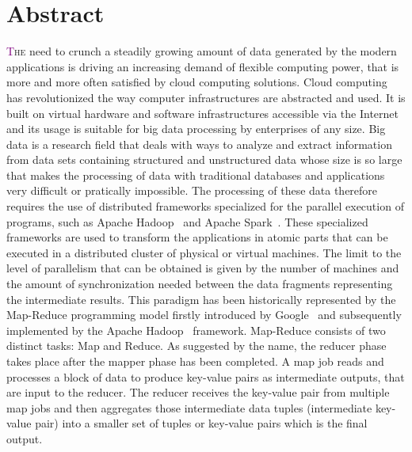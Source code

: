 
\begingroup
\let\clearpage\relax
\let\cleardoublepage\relax
\let\cleardoublepage\relax

\chapter*{Abstract}
\lettrine[lines=4]{\textcolor{purple}{T}}{he} need to crunch a steadily growing amount of data generated by the modern applications is driving an increasing demand of flexible computing power, that is more and more often satisfied by cloud computing solutions. Cloud computing has revolutionized the way computer infrastructures are abstracted and used. It is built on virtual hardware and software infrastructures accessible via the Internet and its usage is suitable for big data processing by enterprises of any size. 
Big data is a research field that deals with ways to analyze and extract information from data sets containing structured and unstructured data whose size is so large that makes the processing of data with traditional databases and applications very difficult or pratically impossible. The processing of these data therefore requires the use of distributed frameworks specialized for the parallel execution of programs, such as Apache Hadoop~\cite{misc:ApacheHadoop} and Apache Spark~\cite{misc:ApacheSpark}. These specialized frameworks are used to transform the applications in atomic parts that can be executed in a distributed cluster of physical or virtual machines. The limit to the level of parallelism that can be obtained is given by the number of machines and the amount of synchronization needed between the data fragments representing the intermediate results. This paradigm has been historically represented by the Map-Reduce programming model firstly introduced by Google~\cite{misc:GoogleMapReduce} and subsequently implemented by the Apache Hadoop~\cite{misc:ApacheHadoop} framework. Map-Reduce consists of two distinct tasks: Map and Reduce. As suggested by the name, the reducer phase takes place after the mapper phase has been completed. A map job reads and processes a block of data to produce key-value pairs as intermediate outputs, that are input to the reducer. The reducer receives the key-value pair from multiple map jobs and then aggregates those intermediate data tuples (intermediate key-value pair) into a smaller set of tuples or key-value pairs which is the final output.
